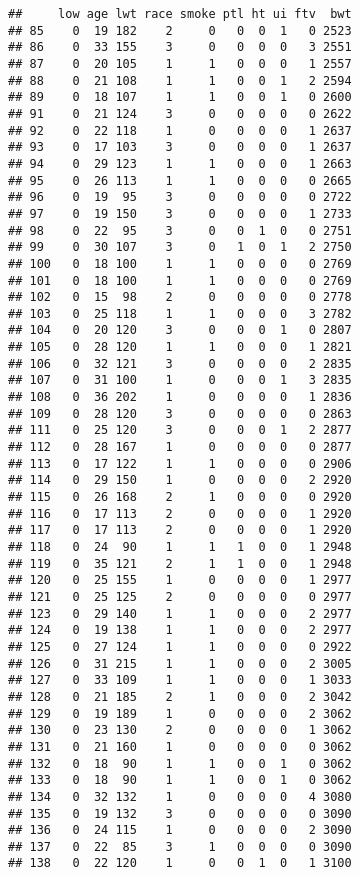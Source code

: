 \documentclass[]{book}
\begin{document}
\begin{verbatim}
##     low age lwt race smoke ptl ht ui ftv  bwt
## 85    0  19 182    2     0   0  0  1   0 2523
## 86    0  33 155    3     0   0  0  0   3 2551
## 87    0  20 105    1     1   0  0  0   1 2557
## 88    0  21 108    1     1   0  0  1   2 2594
## 89    0  18 107    1     1   0  0  1   0 2600
## 91    0  21 124    3     0   0  0  0   0 2622
## 92    0  22 118    1     0   0  0  0   1 2637
## 93    0  17 103    3     0   0  0  0   1 2637
## 94    0  29 123    1     1   0  0  0   1 2663
## 95    0  26 113    1     1   0  0  0   0 2665
## 96    0  19  95    3     0   0  0  0   0 2722
## 97    0  19 150    3     0   0  0  0   1 2733
## 98    0  22  95    3     0   0  1  0   0 2751
## 99    0  30 107    3     0   1  0  1   2 2750
## 100   0  18 100    1     1   0  0  0   0 2769
## 101   0  18 100    1     1   0  0  0   0 2769
## 102   0  15  98    2     0   0  0  0   0 2778
## 103   0  25 118    1     1   0  0  0   3 2782
## 104   0  20 120    3     0   0  0  1   0 2807
## 105   0  28 120    1     1   0  0  0   1 2821
## 106   0  32 121    3     0   0  0  0   2 2835
## 107   0  31 100    1     0   0  0  1   3 2835
## 108   0  36 202    1     0   0  0  0   1 2836
## 109   0  28 120    3     0   0  0  0   0 2863
## 111   0  25 120    3     0   0  0  1   2 2877
## 112   0  28 167    1     0   0  0  0   0 2877
## 113   0  17 122    1     1   0  0  0   0 2906
## 114   0  29 150    1     0   0  0  0   2 2920
## 115   0  26 168    2     1   0  0  0   0 2920
## 116   0  17 113    2     0   0  0  0   1 2920
## 117   0  17 113    2     0   0  0  0   1 2920
## 118   0  24  90    1     1   1  0  0   1 2948
## 119   0  35 121    2     1   1  0  0   1 2948
## 120   0  25 155    1     0   0  0  0   1 2977
## 121   0  25 125    2     0   0  0  0   0 2977
## 123   0  29 140    1     1   0  0  0   2 2977
## 124   0  19 138    1     1   0  0  0   2 2977
## 125   0  27 124    1     1   0  0  0   0 2922
## 126   0  31 215    1     1   0  0  0   2 3005
## 127   0  33 109    1     1   0  0  0   1 3033
## 128   0  21 185    2     1   0  0  0   2 3042
## 129   0  19 189    1     0   0  0  0   2 3062
## 130   0  23 130    2     0   0  0  0   1 3062
## 131   0  21 160    1     0   0  0  0   0 3062
## 132   0  18  90    1     1   0  0  1   0 3062
## 133   0  18  90    1     1   0  0  1   0 3062
## 134   0  32 132    1     0   0  0  0   4 3080
## 135   0  19 132    3     0   0  0  0   0 3090
## 136   0  24 115    1     0   0  0  0   2 3090
## 137   0  22  85    3     1   0  0  0   0 3090
## 138   0  22 120    1     0   0  1  0   1 3100

\end{verbatim}
\end{document}
